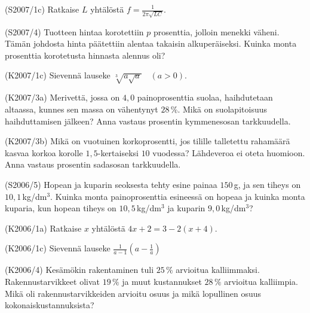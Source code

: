 \begin{tehtava}(S2007/1c) Ratkaise $L$ yhtälöstä $f=\frac{1}{2\pi\sqrt{LC}}$.
\end{tehtava}

\begin{tehtava}(S2007/4) Tuotteen hintaa korotettiin $p$ prosenttia, jolloin menekki väheni. Tämän johdosta hinta päätettiin alentaa takaisin alkuperäiseksi. Kuinka monta prosenttia korotetusta hinnasta alennus oli?
\end{tehtava}

\begin{tehtava}(K2007/1c) Sievennä lauseke $ \sqrt[3]{a \sqrt{a}} \quad (a > 0) $.
\end{tehtava}

\begin{tehtava}(K2007/3a) Merivettä, jossa on $4,0$ painoprosenttia suolaa, haihdutetaan altaassa, kunnes sen massa on vähentynyt $28$\,\%. Mikä on suolapitoisuus haihduttamisen jälkeen? Anna vastaus prosentin kymmenesosan tarkkuudella. 
\end{tehtava}

\begin{tehtava}(K2007/3b) Mikä on vuotuinen korkoprosentti, jos tilille talletettu rahamäärä kasvaa korkoa korolle $1,5$-kertaiseksi $10$ vuodessa? Lähdeveroa ei oteta huomioon. Anna vastaus prosentin sadasosan tarkkuudella.
\end{tehtava}

\begin{tehtava}(S2006/5) Hopean ja kuparin seoksesta tehty esine painaa $150$\,g, ja sen tiheys on $10,1$\,kg/dm$^3$. Kuinka monta painoprosenttia esineessä on hopeaa ja kuinka monta kuparia, kun hopean tiheys on $10,5$\,kg/dm\(^3\) ja kuparin $9,0$\,kg/dm$^3$?
\end{tehtava}

\begin{tehtava}(K2006/1a) Ratkaise $x$ yhtälöstä $4x + 2 =  3 - 2(x + 4)$.
\end{tehtava}

\begin{tehtava}(K2006/1c) Sievennä lauseke 
                        $ \frac{1}{a - 1} \left( a - \frac{1}{a} \right) $
\end{tehtava}

\begin{tehtava}(K2006/4) Kesämökin rakentaminen tuli $25\,\%$ arvioitua kalliimmaksi. Rakennustarvikkeet olivat $19\,\%$ ja muut kustannukset $28\,\% $ arvioitua kalliimpia. Mikä oli rakennustarvikkeiden arvioitu osuus ja mikä lopullinen osuus kokonaiskustannuksista?
\end{tehtava}

